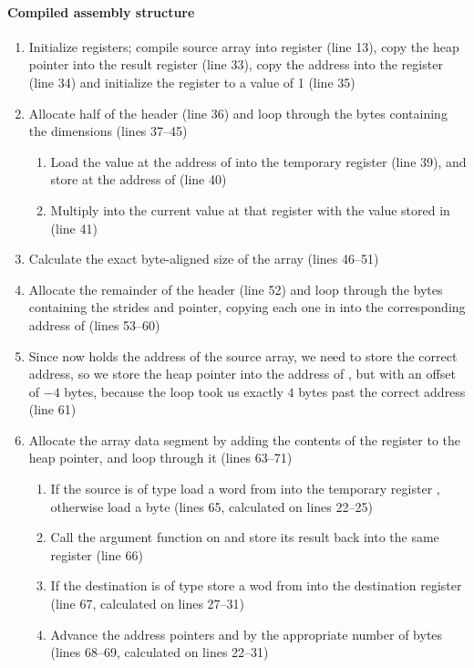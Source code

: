 \paragraph{Compiled assembly structure}
\begin{enumerate}
	\item Initialize registers; compile source array into register 
	(line 13), copy the heap pointer into the result register 
	(line 33), copy the address into the  register (line 34) and
	initialize the  register to a value of 1 (line 35)
	\item Allocate half of the header (line 36) and loop through the bytes
	containing the dimensions (lines 37--45)
	\begin{enumerate}
		\item Load the value at the address of  into the temporary
		register  (line 39), and store at the address of 
		(line 40)
		\item Multiply into  the current value at that register
		with the value stored in  (line 41)
	\end{enumerate}
	\item Calculate the exact byte-aligned size of the array (lines 46--51)
	\item Allocate the remainder of the header (line 52) and loop through the
	bytes containing the strides and pointer, copying each one in 
	into the corresponding address of  (lines 53--60)
	\item Since  now holds the address of the source array, we need
	to store the correct address, so we store the heap pointer into the
	address of , but with an offset of $-4$ bytes, because the loop
	took us exactly $4$ bytes past the correct address (line 61)
	\item Allocate the array data segment by adding the contents of the
	 register to the heap pointer, and loop through it (lines
	63--71)
	\begin{enumerate}
		\item If the source is of type  load a word from 
		into the temporary register , otherwise load a byte (lines
		65, calculated on lines 22--25)
		\item Call the argument function on  and store its result
		back into the same register (line 66)
		\item If the destination is of type  store a wod from
		 into the destination register  (line 67,
		calculated on lines 27--31)
		\item Advance the address pointers  and  by the
		appropriate number of bytes (lines 68--69, calculated on lines 22--31)
	\end{enumerate}
\end{enumerate}

